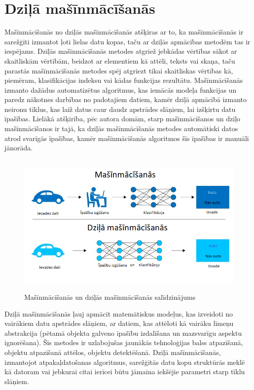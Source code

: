 \documentclass[12pt,paper=a4]{report}
\begin{document}
\section{Dziļā mašīnmācīšanās}
Mašīnmācīšanās no dziļās mašīnmācīšanās atšķiras ar to, ka mašīnmācīšanās ir sarežģīti izmantot ļoti lielas datu kopas, taču ar dziļās apmācības metodēm tas ir iespējams. Dziļās mašīnmācīšanās metodes atgriež jebkādas vērtības sākot ar skaitliskām vērtībām, beidzot ar elementiem kā attēli, teksts vai skaņa, taču parastās mašīnmācīšanās metodes spēj atgriezt tikai skaitliskas vērtības kā, piemēram, klasifikācijas indeksu vai kādas funkcijas rezultātu. Mašīnmācīšanās izmanto dažādus automatizētus algoritmus, kas iemācās modeļa funkcijas un paredz nākotnes darbības no padotajiem datiem, kamēr dziļā apmācībā izmanto neironu tīklus, kas laiž datus caur daudz apstrādes slāņiem, lai izšķirtu datu īpašības. Lielākā atšķirība, pēc autora domām, starp mašīnmācīšanos un dziļo mašīnmācīšanos ir tajā, ka dziļās mašīnmācīšanās metodes automātiski datos atrod svarīgās īpašības, kamēr mašīnmācīšanās algoritmos šīs īpašības ir manuāli jānorāda. 
\begin{figure}[h]%
	\centering
	\includegraphics[height=7cm]{images/deeplearning.png} %
	\caption{Mašīnmācīšanās un dziļās mašīnmācīšanās salīdzinājums}%
	\label{fig:example}%
\end{figure}
Dziļā mašīnmācīšanās ļauj apmācīt matemātiskus modeļus, kas izveidoti no vairākiem datu apstrādes slāņiem, ar datiem, kas attēloti kā vairāku līmeņu abstrakcija (pētamā objekta galveno īpašību izdalīšana un mazsvarīgu aspektu ignorēšana). Šīs metodes ir uzlabojušas jaunākās tehnoloģijas balss atpazīšanā, objektu atpazīšanā attēlos, objektu detektēšanā. Dziļā mašīnmācīšanās, izmantojot atpakaļdatošanas algoritmus, sarežģītās datu kopu struktūrās meklē kā datoram vai jebkurai citai ierīcei būtu jāmaina iekšējie parametri starp tīklu slāņiem.
\end{document}
